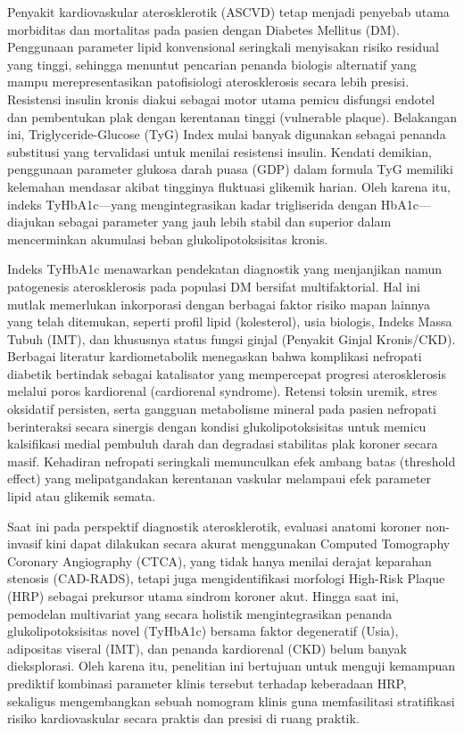 \documentclass[
  indonesian,
]{agujournal2019}
\begin{document}
Penyakit kardiovaskular aterosklerotik (ASCVD) tetap menjadi penyebab
utama morbiditas dan mortalitas pada pasien dengan Diabetes Mellitus
(DM). Penggunaan parameter lipid konvensional seringkali menyisakan
risiko residual yang tinggi, sehingga menuntut pencarian penanda
biologis alternatif yang mampu merepresentasikan patofisiologi
aterosklerosis secara lebih presisi. Resistensi insulin kronis diakui
sebagai motor utama pemicu disfungsi endotel dan pembentukan plak dengan
kerentanan tinggi (vulnerable plaque). Belakangan ini,
Triglyceride-Glucose (TyG) Index mulai banyak digunakan sebagai penanda
substitusi yang tervalidasi untuk menilai resistensi insulin. Kendati
demikian, penggunaan parameter glukosa darah puasa (GDP) dalam formula
TyG memiliki kelemahan mendasar akibat tingginya fluktuasi glikemik
harian. Oleh karena itu, indeks TyHbA1c---yang mengintegrasikan kadar
trigliserida dengan HbA1c---diajukan sebagai parameter yang jauh lebih
stabil dan superior dalam mencerminkan akumulasi beban
glukolipotoksisitas kronis.

Indeks TyHbA1c menawarkan pendekatan diagnostik yang menjanjikan namun
patogenesis aterosklerosis pada populasi DM bersifat multifaktorial. Hal
ini mutlak memerlukan inkorporasi dengan berbagai faktor risiko mapan
lainnya yang telah ditemukan, seperti profil lipid (kolesterol), usia
biologis, Indeks Massa Tubuh (IMT), dan khususnya status fungsi ginjal
(Penyakit Ginjal Kronis/CKD). Berbagai literatur kardiometabolik
menegaskan bahwa komplikasi nefropati diabetik bertindak sebagai
katalisator yang mempercepat progresi aterosklerosis melalui poros
kardiorenal (cardiorenal syndrome). Retensi toksin uremik, stres
oksidatif persisten, serta gangguan metabolisme mineral pada pasien
nefropati berinteraksi secara sinergis dengan kondisi
glukolipotoksisitas untuk memicu kalsifikasi medial pembuluh darah dan
degradasi stabilitas plak koroner secara masif. Kehadiran nefropati
seringkali memunculkan efek ambang batas (threshold effect) yang
melipatgandakan kerentanan vaskular melampaui efek parameter lipid atau
glikemik semata.

Saat ini pada perspektif diagnostik aterosklerotik, evaluasi anatomi
koroner non-invasif kini dapat dilakukan secara akurat menggunakan
Computed Tomography Coronary Angiography (CTCA), yang tidak hanya
menilai derajat keparahan stenosis (CAD-RADS), tetapi juga
mengidentifikasi morfologi High-Risk Plaque (HRP) sebagai prekursor
utama sindrom koroner akut. Hingga saat ini, pemodelan multivariat yang
secara holistik mengintegrasikan penanda glukolipotoksisitas novel
(TyHbA1c) bersama faktor degeneratif (Usia), adipositas viseral (IMT),
dan penanda kardiorenal (CKD) belum banyak dieksplorasi. Oleh karena
itu, penelitian ini bertujuan untuk menguji kemampuan prediktif
kombinasi parameter klinis tersebut terhadap keberadaan HRP, sekaligus
mengembangkan sebuah nomogram klinis guna memfasilitasi stratifikasi
risiko kardiovaskular secara praktis dan presisi di ruang praktik.
\end{document}
